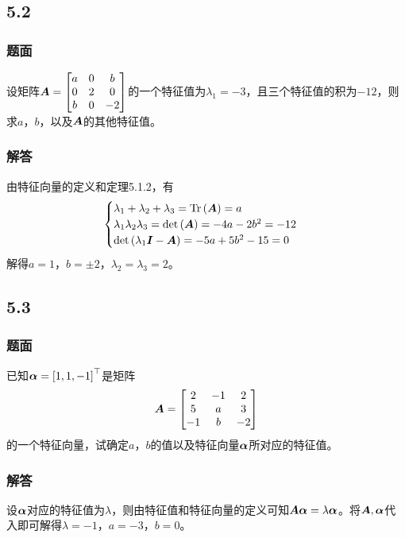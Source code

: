 \documentclass{beamer}
\begin{document}
\subsection*{5.2}
\begin{frame}
    \frametitle{题面}
    设矩阵\(\boldsymbol{A}=\begin{bmatrix}a&0&b\\0&2&0\\b&0&-2\end{bmatrix}\)的一个特征值为\(\lambda_1=-3\)，且三个特征值的积为\(-12\)，则求\(a\)，\(b\)，以及\(\boldsymbol{A}\)的其他特征值。
\end{frame}

\begin{frame}
    \frametitle{解答}
    由特征向量的定义和定理5.1.2，有
    \begin{equation*}
        \begin{cases}
            \lambda_1+\lambda_2+\lambda_3=\mathrm{Tr}\left( \boldsymbol{A} \right)=a        \\
            \lambda_1\lambda_2\lambda_3=\mathrm{det}\left( \boldsymbol{A} \right)=-4a-2b^2=-12 \\
            \mathrm{det}\left( \lambda_1\boldsymbol{I}-\boldsymbol{A} \right)=-5a+5b^2-15=0
        \end{cases}
    \end{equation*}
    \pause
    解得\(a=1\)，\(b=\pm2\)，\(\lambda_2=\lambda_3=2\)。
\end{frame}

\subsection*{5.3}
\begin{frame}
    \frametitle{题面}
    已知\(\boldsymbol{\alpha}=\left[ 1,1,-1 \right]^\top\)是矩阵
    \begin{equation*}
        \boldsymbol{A}=
        \begin{bmatrix}
            2  & -1 & 2  \\
            5  & a  & 3  \\
            -1 & b  & -2
        \end{bmatrix}
    \end{equation*}
    的一个特征向量，试确定\(a\)，\(b\)的值以及特征向量\(\boldsymbol{\alpha}\)所对应的特征值。
\end{frame}

\begin{frame}
    \frametitle{解答}
    设\(\boldsymbol{\alpha}\)对应的特征值为\(\lambda\)，则由特征值和特征向量的定义可知\(\boldsymbol{A}\boldsymbol{\alpha}=\lambda\boldsymbol{\alpha}\)。将\(\boldsymbol{A},\boldsymbol{\alpha}\)代入即可解得\(\lambda=-1\)，\(a=-3\)，\(b=0\)。
\end{frame}
\end{document}
